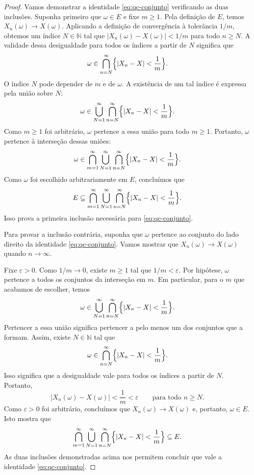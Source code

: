 \documentclass[12pt,portuguese]{article}
\theoremstyle{definition}
\theoremstyle{plainexercise}
\theoremstyle{starredexercise}
\theoremstyle{definition}
\begin{document}
\begin{proof}
Vamos demonstrar a identidade \eqref{eq:qc-conjunto} verificando as duas
inclusões. Suponha primeiro que $\omega\in E$ e fixe $m\geqslant1$. Pela
definição de $E$, temos $X_n(\omega)\to X(\omega)$. Aplicando a definição de
convergência à tolerância $1/m$, obtemos um índice $N\in\mathbb{N}$ tal que
$|X_n(\omega)-X(\omega)|<1/m$ para todo $n\geqslant N$. A validade dessa
desigualdade para todos os índices a partir de $N$ significa que
\[
\omega\in\bigcap_{n=N}^{\infty}
\Bigl\{|X_n-X|<\frac{1}{m}\Bigr\}.
\]
O índice $N$ pode depender de $m$ e de $\omega$. A existência de um tal
índice é expressa pela união sobre $N$:
\[
\omega\in\bigcup_{N=1}^{\infty}\bigcap_{n=N}^{\infty}
\Bigl\{|X_n-X|<\frac{1}{m}\Bigr\}.
\]
Como $m\geqslant1$ foi arbitrário, $\omega$ pertence a essa união para todo
$m\geqslant1$. Portanto, $\omega$ pertence à interseção dessas uniões:
\[
\omega\in\bigcap_{m=1}^{\infty}\bigcup_{N=1}^{\infty}\bigcap_{n=N}^{\infty}
\Bigl\{|X_n-X|<\frac{1}{m}\Bigr\}.
\]
Como $\omega$ foi escolhido arbitrariamente em $E$, concluímos que
\[
E\subseteq
\bigcap_{m=1}^{\infty}\bigcup_{N=1}^{\infty}\bigcap_{n=N}^{\infty}
\Bigl\{|X_n-X|<\frac{1}{m}\Bigr\}.
\]
Isso prova a primeira inclusão necessária para \eqref{eq:qc-conjunto}.


\bigskip 


Para provar a inclusão contrária, suponha que $\omega$ pertence ao conjunto
do lado direito da identidade \eqref{eq:qc-conjunto}. Vamos mostrar que
$X_n(\omega)\to X(\omega)$ quando $n\to\infty$.

Fixe $\varepsilon>0$. Como $1/m\to0$, existe $m\geqslant1$ tal que
$1/m<\varepsilon$. Por hipótese, $\omega$ pertence a todos os conjuntos da
interseção em $m$. Em particular, para o $m$ que acabamos de escolher, temos
\[
\omega\in\bigcup_{N=1}^{\infty}\bigcap_{n=N}^{\infty}
\Bigl\{|X_n-X|<\frac{1}{m}\Bigr\}.
\]
Pertencer a essa união significa pertencer a pelo menos um dos conjuntos
que a formam. Assim, existe $N\in\mathbb{N}$ tal que
\[
\omega\in\bigcap_{n=N}^{\infty}
\Bigl\{|X_n-X|<\frac{1}{m}\Bigr\}.
\]
Isso significa que a desigualdade vale para todos os índices a partir de $N$.
Portanto,
\[
|X_n(\omega)-X(\omega)|<\frac{1}{m}<\varepsilon
\qquad\text{para todo }n\geqslant N.
\]
Como $\varepsilon>0$ foi arbitrário, concluímos que
$X_n(\omega)\to X(\omega)$ e, portanto, $\omega\in E$. Isto mostra que
\[
\bigcap_{m=1}^{\infty}\bigcup_{N=1}^{\infty}\bigcap_{n=N}^{\infty}
\Bigl\{|X_n-X|<\frac{1}{m}\Bigr\}
\subseteq E.
\]
As duas inclusões demonstradas acima nos permitem concluir que
vale a identidade \eqref{eq:qc-conjunto}.



\end{proof}
\end{document}
